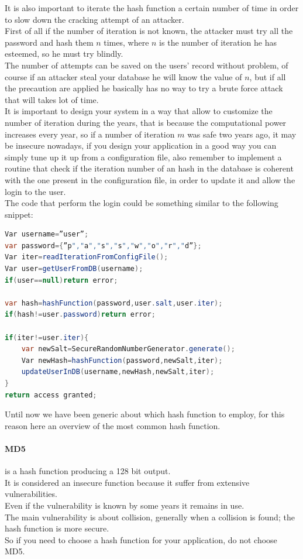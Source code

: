 It is also important to iterate the hash function a certain number of time in order to slow down the cracking attempt of an attacker.\\
First of all if the number of iteration is not known, the attacker must try all the password and hash them $n$ times, where $n$ is the number of iteration he has esteemed, so he must try blindly.\\
The number of attempts can be saved on the users’ record without problem, of course if an attacker steal your database he will know the value of $n$, but if all the precaution are applied he basically has no way to try a brute force attack that will takes lot of time.\\
It is important to design your system in a way that allow to customize the number of iteration during the years, that is because the computational power increases every year, so if a number of iteration $m$ was safe two years ago, it may be insecure nowadays, if you design your application in a good way you can simply tune up it up from a configuration file, also remember to implement a routine that check if the iteration number of an hash in the database is coherent with the one present in the configuration file, in order to update it and allow the login to the user.\\


The code that perform the login could be something similar to the following snippet:
\begin{lstlisting}[language=Java]
Var username=”user”;
var password={”p","a","s","s","w","o","r","d”};
Var iter=readIterationFromConfigFile();
Var user=getUserFromDB(username);
if(user==null)return error;

var hash=hashFunction(password,user.salt,user.iter);
if(hash!=user.password)return error;

if(iter!=user.iter){
	var newSalt=SecureRandomNumberGenerator.generate();
	Var newHash=hashFunction(password,newSalt,iter);
	updateUserInDB(username,newHash,newSalt,iter);
}
return access granted;
\end{lstlisting}

Until now we have been generic about which hash function to employ, for this reason here an overview of the most common hash function.



\paragraph{MD5} is a hash function producing a 128 bit output.\\
It is considered an insecure function because it suffer from extensive vulnerabilities.\\
Even if the vulnerability is known by some years it remains in use.\\
The main vulnerability is about collision, generally when a collision is found; the hash function is more secure.\\
So if you need to choose a hash function for your application, do not choose MD5\cite{md5}.\\


